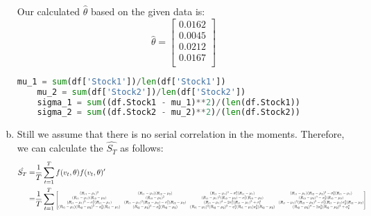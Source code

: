 \begin{enumerate}[(a)]
Our calculated $\hat{\theta}$ based on the given data is:
\begin{equation*}
  \hat{\theta} = \begin{bmatrix}
     0.0162 \\
     0.0045 \\
     0.0212 \\
     0.0167 \\
  \end{bmatrix}
\end{equation*}
\begin{center}
  \begin{lstlisting}[language=Python, caption=Python code for calculating $\hat{\theta}$, label={lst:q1a}, escapechar=|, frame=single, basicstyle=\small, showstringspaces=false, captionpos=b, breaklines=true, showspaces=false, showtabs=false, keywordstyle=\color{blue}, commentstyle=\color{gray}]
    mu_1 = sum(df['Stock1'])/len(df['Stock1'])
    mu_2 = sum(df['Stock2'])/len(df['Stock2'])
    sigma_1 = sum((df.Stock1 - mu_1)**2)/(len(df.Stock1))
    sigma_2 = sum((df.Stock2 - mu_2)**2)/(len(df.Stock2))
  \end{lstlisting}
\end{center}
\item Still we assume that there is no serial correlation in the moments. Therefore, we can calculate the $\hat{S_T}$ as follows:
\begin{equation*}
  \begin{aligned}
    \hat{S_T} = & \frac{1}{T} \sum_{t=1}^T f(v_t,\theta) f(v_t,\theta)'\\
    =& \frac{1}{T}\sum_{t=1}^T\scalemath{0.5}{ \begin{bmatrix}
      (R_{t1} - \mu_1)^2 & (R_{t1} - \mu_1)(R_{t2} - \mu_2) & (R_{t1} - \mu_1)^3 - \sigma_1^2(R_{t1} - \mu_1) & (R_{t1} - \mu_1)(R_{t2} - \mu_2)^2 - \sigma_2^2(R_{t1} - \mu_1)\\
      (R_{t1} - \mu_1)(R_{t2} - \mu_2) & (R_{t2} - \mu_2)^2 & (R_{t1} - \mu_1)^2(R_{t2} - \mu_2) - \sigma_1^2(R_{t2} - \mu_2) & (R_{t2} - \mu_2)^3 - \sigma_2^2(R_{t2} - \mu_2)\\
      (R_{t1} - \mu_1)^3 - \sigma_1^2(R_{t1} - \mu_1) & (R_{t1} - \mu_1)^2(R_{t2} - \mu_2) - \sigma_1^2(R_{t2} - \mu_2) & (R_{t1} - \mu_1)^4 - 2\sigma_1^2(R_{t1} - \mu_1)^2 + \sigma_1^4 & (R_{t1} - \mu_1)^2(R_{t2} - \mu_2)^2 - \sigma_1^2(R_{t1} - \mu_1)\sigma_2^2(R_{t2} - \mu_2)\\
      (R_{t1} - \mu_1)(R_{t2} - \mu_2)^2 - \sigma_2^2(R_{t1} - \mu_1) & (R_{t2} - \mu_2)^3 - \sigma_2^2(R_{t2} - \mu_2) & (R_{t1} - \mu_1)^2(R_{t2} - \mu_2)^2 - \sigma_1^2(R_{t1} - \mu_1)\sigma_2^2(R_{t2} - \mu_2) & (R_{t2} - \mu_2)^4 - 2\sigma_2^2(R_{t2} - \mu_2)^2 + \sigma_2^4\\
    \end{bmatrix}} \\
  \end{aligned}
\end{equation*}



\end{enumerate}


